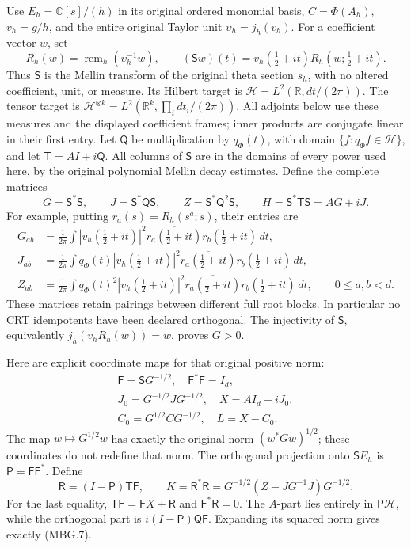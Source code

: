 Use \(E_h=\mathbb{C}[s]/(h)\) in its original ordered monomial basis,
\(C=\Phi(A_h)\), \(v_h=g/h\), and the entire original Taylor unit
\(\upsilon_h=j_h(v_h)\). For a coefficient vector \(w\), set
\[
 R_h(w)=\operatorname{rem}_h(\upsilon_h^{-1}w),\qquad
 (\mathsf S w)(t)=v_h(\tfrac12+it)R_h(w;\tfrac12+it).
 \tag{MBG.3}\label{GraphV2:eq:mbg-S}
\]
Thus \(\mathsf S\) is the Mellin transform of the original theta section
\(s_h\), with no altered coefficient, unit, or measure. Its Hilbert
target is \(\mathscr H=L^2(\mathbb{R},dt/(2\pi))\). The tensor target
is \(\mathscr H^{\otimes k}=L^2(\mathbb{R}^k,\prod_i dt_i/(2\pi))\).
All adjoints below use these measures and the displayed coefficient
frames; inner products are conjugate linear in their first entry.
Let \(\mathsf Q\) be multiplication by \(q_\Phi(t)\), with domain
\(\{f:q_\Phi f\in\mathscr H\}\), and let
\(\mathsf T=A I+i\mathsf Q\). All columns of \(\mathsf S\) are in
the domains of every power used here, by the original polynomial
Mellin decay estimates. Define the complete matrices
\[
 G=\mathsf S^*\mathsf S,\qquad
 J=\mathsf S^*\mathsf Q\mathsf S,\qquad
 Z=\mathsf S^*\mathsf Q^2\mathsf S,\qquad
 H=\mathsf S^*\mathsf T\mathsf S=A G+iJ.
 \tag{MBG.4}\label{GraphV2:eq:mbg-moments}
\]
For example, putting \(r_a(s)=R_h(s^a;s)\), their entries are
\[
 \begin{split}
 G_{ab}&=\frac1{2\pi}\int
   |v_h(\tfrac12+it)|^2\overline{r_a(\tfrac12+it)}r_b(\tfrac12+it)\,dt,\\
 J_{ab}&=\frac1{2\pi}\int q_\Phi(t)
   |v_h(\tfrac12+it)|^2\overline{r_a(\tfrac12+it)}r_b(\tfrac12+it)\,dt,\\
 Z_{ab}&=\frac1{2\pi}\int q_\Phi(t)^2
   |v_h(\tfrac12+it)|^2\overline{r_a(\tfrac12+it)}r_b(\tfrac12+it)\,dt,
 \qquad 0\le a,b<d .
 \end{split}
 \tag{MBG.5}\label{GraphV2:eq:mbg-all-entries}
\]
These matrices retain pairings between different full root blocks.
In particular no CRT idempotents have been declared orthogonal.
The injectivity of \(\mathsf S\), equivalently \(j_h(v_hR_h(w))=w\),
proves \(G>0\).

Here are explicit coordinate maps for that original positive norm:
\[
 \begin{gathered}
 \mathsf F=\mathsf S G^{-1/2},\quad \mathsf F^*\mathsf F=I_d,\\
 J_0=G^{-1/2}JG^{-1/2},\quad X=A I_d+iJ_0,\\
 C_0=G^{1/2}CG^{-1/2},\quad L=X-C_0.
 \end{gathered}
 \tag{MBG.6}\label{GraphV2:eq:mbg-coordinates}
\]
The map \(w\mapsto G^{1/2}w\) has exactly the original norm
\((w^*Gw)^{1/2}\); these coordinates do not redefine that norm.
The orthogonal projection onto \(\mathsf S E_h\) is
\(\mathsf P=\mathsf F\mathsf F^*\). Define
\[
 \mathsf R=(I-\mathsf P)\mathsf T\mathsf F,\qquad
 K=\mathsf R^*\mathsf R
  =G^{-1/2}(Z-JG^{-1}J)G^{-1/2}.
 \tag{MBG.7}\label{GraphV2:eq:mbg-covariance}
\]
For the last equality, \(\mathsf T\mathsf F=\mathsf F X+\mathsf R\)
and \(\mathsf F^*\mathsf R=0\). The \(A\)-part lies entirely in
\(\mathsf P\mathscr H\), while the orthogonal part is
\(i(I-\mathsf P)\mathsf Q\mathsf F\). Expanding its squared norm
gives exactly (MBG.7).


